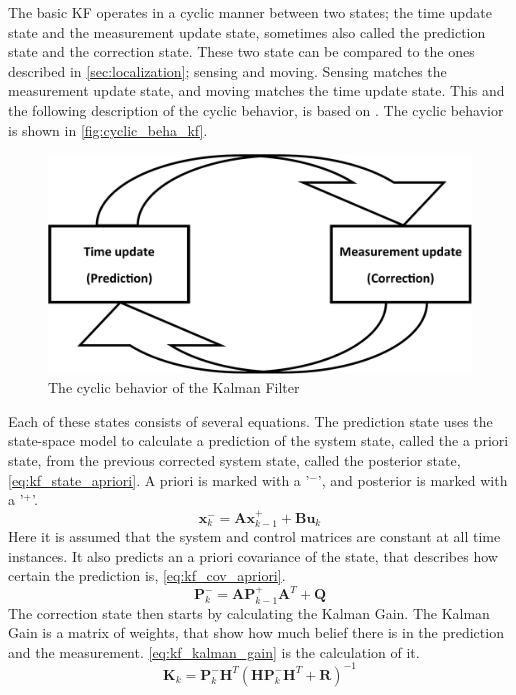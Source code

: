 \documentclass[Main]{subfiles}
\begin{document}
The basic KF operates in a cyclic manner between two states; the time update state and the measurement update state, sometimes also called the prediction state and the correction state. 
These two state can be compared to the ones described in \autoref{sec:localization}; sensing and moving.
Sensing matches the measurement update state, and moving matches the time update state.
This and the following description of the cyclic behavior, is based on \cite{Simon2006}.
The cyclic behavior is shown in \autoref{fig:cyclic_beha_kf}.
\begin{figure}[H]
	\centering
	\includegraphics[width=0.5\linewidth]{./Figures/kf_states.png}
	\caption{The cyclic behavior of the Kalman Filter}
	\label{fig:cyclic_beha_kf}
\end{figure}\noindent
Each of these states consists of several equations. 
The prediction state uses the state-space model to calculate a prediction of the system state, called the a priori state, from the previous corrected system state, called the posterior state, \autoref{eq:kf_state_apriori}.
A priori is marked with a '$^-$', and posterior is marked with a '$^+$'.
\begin{equation}
	\label{eq:kf_state_apriori}
	\mathbf{x}_k^-=\mathbf{A} \mathbf{x}_{k-1}^+ + \mathbf{B} \mathbf{u}_k
\end{equation}
Here it is assumed that the system and control matrices are constant at all time instances.
It also predicts an a priori covariance of the state, that describes how certain the prediction is, \autoref{eq:kf_cov_apriori}.
\begin{equation}
	\label{eq:kf_cov_apriori}
	\mathbf{P}_k^-=\mathbf{A} \mathbf{P}_{k-1}^+ \mathbf{A}^T+\mathbf{Q}
\end{equation}
The correction state then starts by calculating the Kalman Gain. 
The Kalman Gain is a matrix of weights, that show how much belief there is in the prediction and the measurement. \autoref{eq:kf_kalman_gain} is the calculation of it.
\begin{equation}
	\label{eq:kf_kalman_gain}
	\mathbf{K}_k = \mathbf{P}_k^- \mathbf{H}^T (\mathbf{H} \mathbf{P}_k^- \mathbf{H}^T + \mathbf{R})^{-1}
\end{equation}
\end{document}
